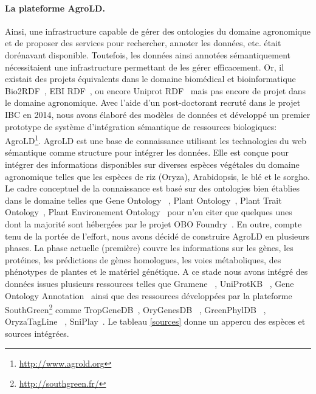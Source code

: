\paragraph*{La plateforme AgroLD.} Ainsi, une infrastructure capable de gérer des ontologies du domaine agronomique et de proposer des services pour rechercher, annoter les données, etc. était dorénavant disponible. Toutefois, les données ainsi annotées sémantiquement nécessitaient une infrastructure permettant de les gérer efficacement. Or, il existait des projets équivalents dans le domaine biomédical et bioinformatique Bio2RDF~\cite{Belleau2008a,Callahan2013}, EBI RDF~\cite{Jupp2014}, ou encore Uniprot RDF~\cite{redaschi2009}  mais pas encore de projet dans le domaine agronomique. Avec l’aide d’un post-doctorant recruté dans le projet IBC en 2014, nous avons élaboré des modèles de données et développé un premier prototype de système d’intégration sémantique de ressources biologiques: AgroLD\footnote{\url{http://www.agrold.org}}. AgroLD est une base de connaissance utilisant les technologies du web sémantique comme structure pour intégrer les données. Elle est conçue pour intégrer des informations disponibles sur diverses espèces végétales du domaine agronomique telles que les espèces de riz (Oryza), Arabidopsis, le blé et le sorgho. Le cadre conceptuel de la connaissance est basé sur des ontologies bien établies dans le domaine telles que Gene Ontology ~\cite{Ashburner2000,TheGeneOntologyConsortium2014}, Plant Ontology~\cite{plantOntology2002}, Plant Trait Ontology~\cite{planteome2018}, Plant Environement Ontology~\cite{envo2016} pour n'en citer que quelques unes dont la majorité sont hébergées par le projet OBO Foundry~\cite{Smith2007}. En outre, compte tenu de la portée de l'effort, nous avons décidé de construire AgroLD en plusieurs phases. La phase actuelle (première) couvre les informations sur les gènes, les protéines, les prédictions de gènes homologues, les voies métaboliques, des phénotypes de plantes et le matériel génétique. A ce stade nous avons intégré des données issues plusieurs ressources telles que Gramene~\cite{gramene2018} , UniProtKB~\cite{uniprot2011} , Gene Ontology Annotation~\cite{goa2009}  ainsi que des ressources développées par la plateforme SouthGreen\footnote{\url{http://southgreen.fr/}} comme TropGeneDB~\cite{tropgenedb2012}, OryGenesDB~\cite{Droc2009b} , GreenPhylDB~\cite{greenphyl2011} , OryzaTagLine~\cite{larmande2008} , SniPlay~\cite{sniplay3}.  Le tableau \ref{sources} donne un appercu des espèces et sources intégrées.\\

